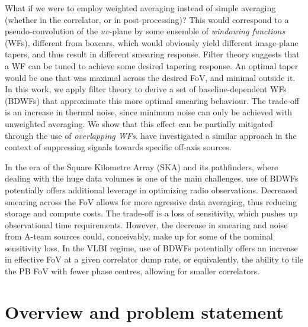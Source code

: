 \documentclass[useAMS,usenatbib]{mn2e}
\begin{document}
What if we were to employ weighted averaging instead of simple averaging (whether in the correlator, or in post-processing)? 
This would correspond to a  pseudo-convolution of the $uv$-plane by some ensemble of \emph{windowing functions} (WFs), 
different from boxcars, which would obviously yield different image-plane tapers, and thus result in different 
smearing response. Filter theory suggests that a WF can be tuned to achieve some desired tapering response. 
An optimal taper would be one that was maximal across the desired FoV, and minimal outside it. In this work, 
we apply filter theory to derive a set of baseline-dependent WFs (BDWFs) that approximate this more optimal smearing 
behaviour. The trade-off is an increase in thermal noise, since minimum noise can only be achieved with 
unweighted averaging. We show that this effect can be partially mitigated through the use of \emph{overlapping WFs}. 
\citet{offringa-filtering} have investigated a similar approach in the context of suppressing signals towards specific off-axis
sources. 

In the era of the Square Kilometre Array (SKA) and its pathfinders, where dealing with the huge data volumes is one of
the main challenges, use of BDWFs potentially offers additional leverage in optimizing radio observations. 
Decreased smearing across the FoV allows for more agressive data averaging, thus reducing storage and compute costs. 
The trade-off is a loss of sensitivity, which pushes up observational time requirements. However, the decrease in smearing
and noise from A-team sources could, conceivably, make up for some of the nominal sensitivity loss. 
In the VLBI regime, use of BDWFs potentially offers an increase in effective FoV at a given correlator dump rate, or 
equivalently, the ability to tile the PB FoV with fewer phase centres, allowing
for smaller correlators.

\section{Overview and problem statement}
\end{document}
